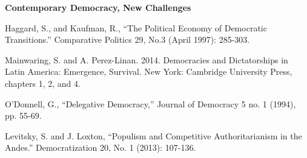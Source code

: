 \documentclass[letterpaper]{article}
\renewenvironment{itemize}{
  \begin{list}{}{
    \setlength{\leftmargin}{1.5em}
  }
}{
  \end{list}
}
\begin{document}
\begin{enumerate}
\item {\bf Contemporary Democracy, New Challenges}
	\begin{itemize}
		\item[$\bullet$] Haggard, S., and Kaufman, R., ``The Political Economy of Democratic Transitions.'' Comparative Politics 29, No.3 (April 1997): 285-303.		
		\item[$\bullet$] Mainwaring, S. and A. Perez-Linan. 2014. Democracies and Dictatorships in Latin America: Emergence, Survival. New York: Cambridge University Press, chapters 1, 2, and 4.
		\item[$\bullet$] O'Donnell, G., ``Delegative Democracy,'' Journal of Democracy 5 no. 1 (1994), pp. 55-69.
		\item[$\bullet$] Levitsky, S. and J. Loxton, ``Populism and Competitive Authoritarianism in the Andes.'' Democratization 20, No. 1 (2013): 107-136.
	\end{itemize}



\end{enumerate}
\end{document}
